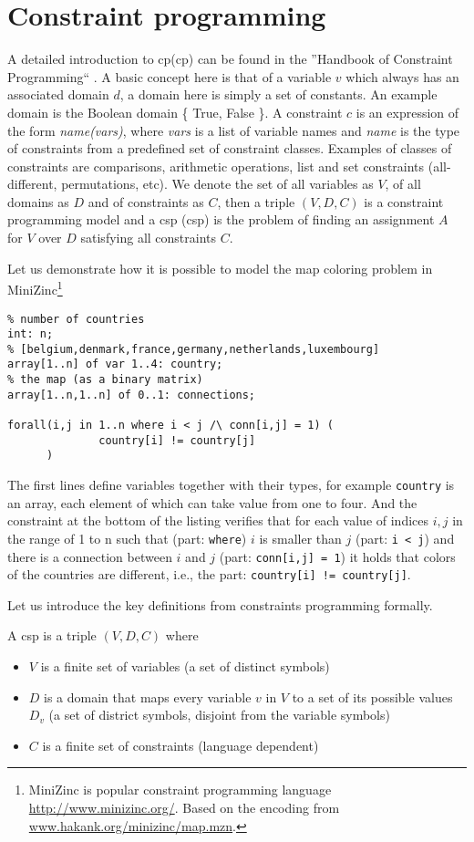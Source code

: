 \section{Constraint programming}
A detailed introduction to \acrlong{cp}(\acrshort{cp}) can be found in the ''Handbook of Constraint Programming`` \parencite{handbookcp}. A basic concept here is that of a variable $v$ which always has an associated domain $d$, a domain here is simply a set of constants. An example domain is the Boolean domain \{ True, False \}. A constraint $c$ is an expression of the form \textit{name(vars)}, where \textit{vars} is a list of variable names and \textit{name} is the type of constraints from a predefined set of constraint classes. Examples of classes of constraints are comparisons,   arithmetic operations, list and set constraints (all-different, permutations, etc). We denote the set of all variables as $V$, of all domains as $D$ and of constraints as $C$, then a triple $(V,D,C)$ is a constraint programming model and a \acrlong{csp} (\acrshort{csp}) is the problem of finding an assignment $A$ for $V$ over $D$ satisfying all constraints $C$.

Let us demonstrate how it is possible to model the map coloring problem in MiniZinc\footnote{MiniZinc is popular constraint programming language \url{http://www.minizinc.org/}. Based on the encoding from \url{www.hakank.org/minizinc/map.mzn}.}  
\begin{lstlisting}
% number of countries
int: n; 
% [belgium,denmark,france,germany,netherlands,luxembourg]
array[1..n] of var 1..4: country; 
% the map (as a binary matrix)
array[1..n,1..n] of 0..1: connections; 

forall(i,j in 1..n where i < j /\ conn[i,j] = 1) (
              country[i] != country[j]
      )
\end{lstlisting}
The first lines define variables together with their types, for example \texttt{country} is an array, each element of which can take value from one to four. And the constraint at the bottom of the listing verifies that for each value of indices $i,j$ in the range of 1 to n such that (part: \texttt{where}) $i$ is smaller than $j$ (part: \texttt{i < j}) and there is a connection between $i$ and $j$ (part: \texttt{conn[i,j] = 1}) it holds that colors of the countries are different, i.e., the part: \texttt{country[i] != country[j]}.

Let us introduce the key definitions from constraints programming formally.
\begin{definition}
    A \acrshort{csp} is a triple $(V,D,C)$ where
    \begin{itemize}
        \item $V$ is a finite set of variables (a set of distinct symbols)
        \item $D$ is a domain that maps every variable $v$ in $V$ to a set of its possible values $D_v$ (a set of district symbols, disjoint from the variable symbols)
        \item $C$ is a finite set of constraints (language dependent)
    \end{itemize}
\end{definition}


